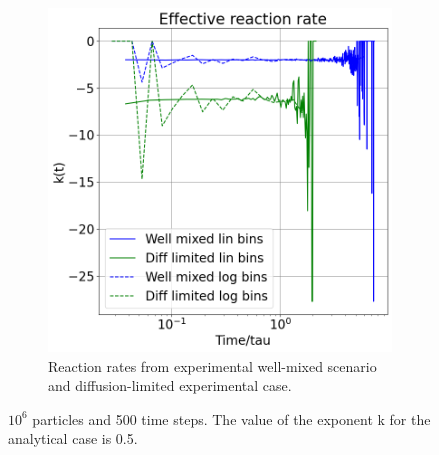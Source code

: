 \documentclass{article}
\begin{document}
\begin{figure}[htbp]
\begin{subfigure}[b]{0.45\textwidth}
        \includegraphics[width=\textwidth]{images/compareDecayDegradationRatesNorm.png}
        \caption{Reaction rates from experimental well-mixed scenario and diffusion-limited experimental case.}
    \end{subfigure}
    \caption{$10^6$ particles and 500 time steps. The value of the exponent k for the analytical case is 0.5.}
    \label{fig:survTimeAndRatesNorm}
\end{figure}

\FloatBarrier  %
\end{document}
